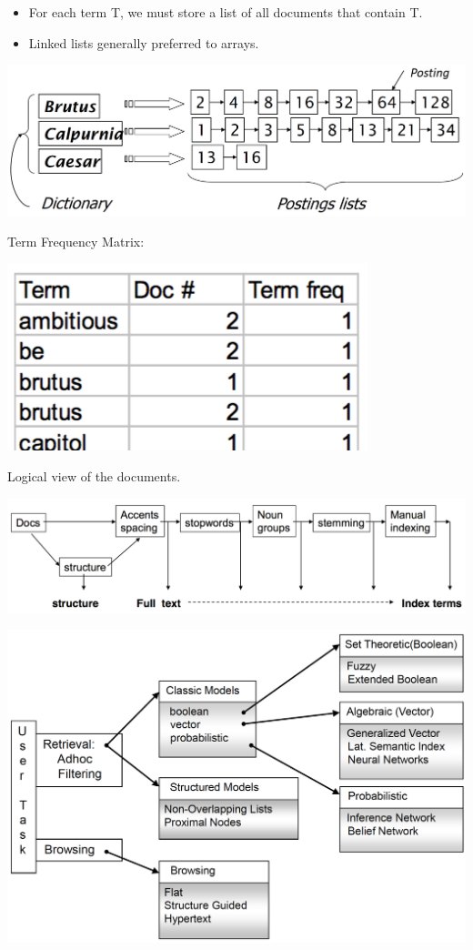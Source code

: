 \begin{breakbox}
\begin{itemize}
	\item For each term T, we must store a list of all documents that contain T.
	\item Linked lists generally preferred to arrays.
\end{itemize}
\begin{center}
\includegraphics[width=.15\textwidth]{slides_images/inverted_index}
\end{center}
Term Frequency Matrix:
\begin{center}
\includegraphics[width=.05\textwidth]{slides_images/term_frequency_matrix}
\end{center}
\end{breakbox}

\begin{breakbox}
\newline Logical view of the documents.
\begin{center}
\includegraphics[width=.15\textwidth]{slides_images/full_to_index}
\end{center}
\end{breakbox}

\begin{breakbox}
\begin{center}
\includegraphics[width=.15\textwidth]{slides_images/ir_models}
\end{center}
\end{breakbox}
